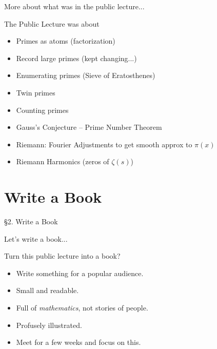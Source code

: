 \documentclass{beamer}
\newcommand{\mysection}[2]{\section{#2}%
\begin{frame}{}
\vfill
\begin{center}
\Huge\sc \S#1. #2
\end{center}
\vfill
\end{frame}}
\begin{document}
\begin{frame}{More about what was in the public lecture...}
  \begin{block}{The Public Lecture was about}
    \begin{itemize}
      \item Primes as atoms (factorization)
      \item Record large primes (kept changing...)
      \item Enumerating primes (Sieve of Eratosthenes)
      \item Twin primes
      \item Counting primes
      \item Gauss's Conjecture -- Prime Number Theorem
      \item Riemann: Fourier Adjustments to get smooth approx to $\pi(x)$
      \item Riemann Harmonics (zeros of $\zeta(s)$)
    \end{itemize}

  \end{block}


\end{frame}

\mysection{2}{Write a Book}

\begin{frame}{Let's write a book...}
  \begin{block}{Turn this public lecture into a book?}

    \begin{itemize}
      \item Write something for a popular audience.
      \item Small and readable.
      \item Full of {\em mathematics}, not stories of people.
      \item Profusely illustrated.
      \item Meet for a few weeks and focus on this.
    \end{itemize}
  \end{block}
\end{frame}
\end{document}
